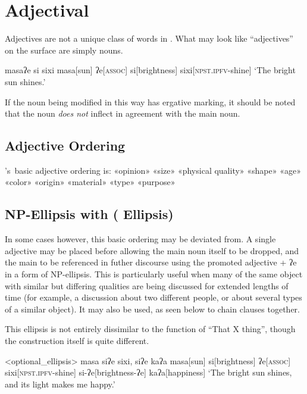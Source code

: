 \chapter{Adjectival}\label{ch:adjectives}
Adjectives are not a unique class of words in \langname .
What may look like ``adjectives'' on the surface are simply nouns.

\ex
\begingl
\glpreamble masaʔe si sixi
\endpreamble
\nogloss{\lbrack}
masa[sun]
ʔe[\textsc{assoc}]
si[brightness]
\nogloss{\rbrack}
sixi[\textsc{npst.ipfv}-shine]
\glft `The bright sun shines.'
\endgl
\xe

If the noun being modified in this way has ergative marking, it should be noted that the noun \textit{does not} inflect in agreement with the main noun.

\section{Adjective Ordering}

\langname 's\ basic adjective ordering is: «opinion» «size» «physical quality» «shape» «age» «color» «origin» «material» «type» «purpose»

\section[\langword{ʔe} Ellipsis]{NP-Ellipsis with  ( Ellipsis)}\label{sec:ellipsis}

In some cases however, this basic ordering may be deviated from.
A single adjective may be placed before  allowing the main noun itself to be dropped, and the main to be referenced in futher discourse using the promoted adjective + ʔe in a form of NP-ellipsis.
This is particularly useful when many of the same object with similar but differing qualities are being discussed for extended lengths of time (for example, a discussion about two different people, or about several types of a similar object).
It may also be used, as seen below to chain clauses together.

This ellipsis is not entirely dissimilar to the function of ``That X thing'', though the construction itself is quite different.

\ex<optional_ellipsis>
\begingl
\glpreamble masa siʔe sixi, siʔe kaʔa
\endpreamble
\nogloss{\lbrack}
masa[sun]
si[brightness]
ʔe[\textsc{assoc}]
\nogloss{\rbrack}
sixi[\textsc{npst.ipfv}-shine]
si-ʔe[brightness-ʔe]
kaʔa[happiness]
\glft `The bright sun shines, and its light makes me happy.'
\endgl
\xe


